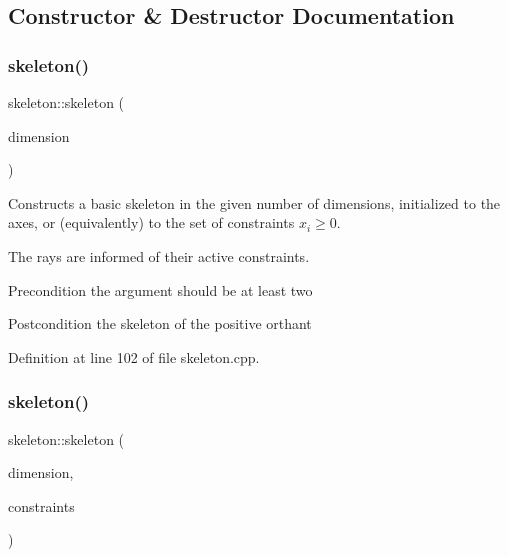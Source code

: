 \subsection{Constructor \& Destructor Documentation}
\mbox{\label{classskeleton_a60f5818e984abe589ea8298d189cd9c6}} 
\subsubsection{\texorpdfstring{skeleton()}{skeleton()}\hspace{0.1cm}{\footnotesize\ttfamily [1/2]}}
{\footnotesize\ttfamily skeleton\+::skeleton (\begin{DoxyParamCaption}\item[{N\+V\+A\+R\+\_\+\+T\+Y\+PE}]{dimension }\end{DoxyParamCaption})}



Constructs a basic skeleton in the given number of dimensions, initialized to the axes, or (equivalently) to the set of constraints $ x_i \geq 0 $. 

The rays are informed of their active constraints. \begin{DoxyPrecond}{Precondition}
the argument should be at least two 
\end{DoxyPrecond}
\begin{DoxyPostcond}{Postcondition}
the skeleton of the positive orthant 
\end{DoxyPostcond}


Definition at line 102 of file skeleton.\+cpp.

\mbox{\label{classskeleton_a5d0ebc69ae4ff20afd3096e36b31ab1f}} 
\subsubsection{\texorpdfstring{skeleton()}{skeleton()}\hspace{0.1cm}{\footnotesize\ttfamily [2/2]}}
{\footnotesize\ttfamily skeleton\+::skeleton (\begin{DoxyParamCaption}\item[{N\+V\+A\+R\+\_\+\+T\+Y\+PE}]{dimension,  }\item[{vector$<$ \hyperlink{classconstraint}{constraint} $>$ \&}]{constraints }\end{DoxyParamCaption})}




